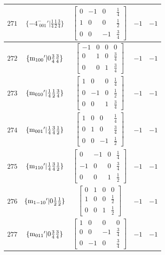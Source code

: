 \documentclass[fleqn,8pt]{jsarticle}
\begin{document}
\begin{longtable}{ccccc}
$ 271 $ & $ \{-4^{-}_{\,\,001}{}'|\frac{1}{4} \frac{1}{2} \frac{3}{4}\} $ & $ \begin{bmatrix} 0 & -1 & 0 & \frac{1}{4} \\ 1 & 0 & 0 & \frac{1}{2} \\ 0 & 0 & -1 & \frac{3}{4} \end{bmatrix} $ & $ -1 $ & $ -1 $ \\ \hline
$ 272 $ & $ \{{\rm m}_{100}{}'|0 \frac{3}{4} \frac{3}{4}\} $ & $ \begin{bmatrix} -1 & 0 & 0 & 0 \\ 0 & 1 & 0 & \frac{3}{4} \\ 0 & 0 & 1 & \frac{3}{4} \end{bmatrix} $ & $ -1 $ & $ -1 $ \\ \hline
$ 273 $ & $ \{{\rm m}_{010}{}'|\frac{1}{4} \frac{1}{2} \frac{3}{4}\} $ & $ \begin{bmatrix} 1 & 0 & 0 & \frac{1}{4} \\ 0 & -1 & 0 & \frac{1}{2} \\ 0 & 0 & 1 & \frac{3}{4} \end{bmatrix} $ & $ -1 $ & $ -1 $ \\ \hline
$ 274 $ & $ \{{\rm m}_{001}{}'|\frac{1}{4} \frac{3}{4} \frac{1}{2}\} $ & $ \begin{bmatrix} 1 & 0 & 0 & \frac{1}{4} \\ 0 & 1 & 0 & \frac{3}{4} \\ 0 & 0 & -1 & \frac{1}{2} \end{bmatrix} $ & $ -1 $ & $ -1 $ \\ \hline
$ 275 $ & $ \{{\rm m}_{110}{}'|\frac{1}{4} \frac{3}{4} \frac{1}{2}\} $ & $ \begin{bmatrix} 0 & -1 & 0 & \frac{1}{4} \\ -1 & 0 & 0 & \frac{3}{4} \\ 0 & 0 & 1 & \frac{1}{2} \end{bmatrix} $ & $ -1 $ & $ -1 $ \\ \hline
$ 276 $ & $ \{{\rm m}_{1-10}{}'|0 \frac{1}{2} \frac{1}{2}\} $ & $ \begin{bmatrix} 0 & 1 & 0 & 0 \\ 1 & 0 & 0 & \frac{1}{2} \\ 0 & 0 & 1 & \frac{1}{2} \end{bmatrix} $ & $ -1 $ & $ -1 $ \\ \hline
$ 277 $ & $ \{{\rm m}_{011}{}'|0 \frac{3}{4} \frac{3}{4}\} $ & $ \begin{bmatrix} 1 & 0 & 0 & 0 \\ 0 & 0 & -1 & \frac{3}{4} \\ 0 & -1 & 0 & \frac{3}{4} \end{bmatrix} $ & $ -1 $ & $ -1 $ \\ \hline

\end{longtable}
\end{document}
